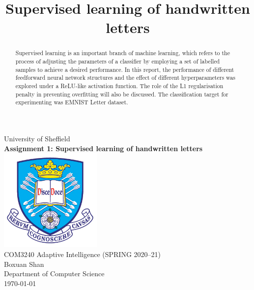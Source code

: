 \documentclass[conference]{IEEEtran}
\begin{document}
\begin{titlepage}


    \begin{center}
        {\LARGE University of Sheffield}\\[1.5cm]
        \linespread{1.2}\huge {\bfseries Assignment 1: Supervised learning of handwritten letters}\\[1.5cm]
        \linespread{1}
        \includegraphics[width=5cm]{images/tuoslogo.png}\\[1cm]
        {\large COM3240 Adaptive Intelligence (SPRING 2020--21)}\\[1cm]
        {\Large Boxuan Shan}\\[6cm]
        \large Department of Computer Science\\[1cm]
        \today
    \end{center}

\end{titlepage}

\title{Supervised learning of handwritten letters}

\author{
}

\maketitle

\thispagestyle{plain}
\pagestyle{plain}

\begin{abstract}
    Supervised learning is an important branch of machine learning, which refers to the process of adjusting the parameters of a classifier by employing a set of labelled samples to achieve a desired performance. In this report, the performance of different feedforward neural network structures and the effect of different hyperparameters was explored under a ReLU-like activation function. The role of the L1 regularisation penalty in preventing overfitting will also be discussed. The classification target for experimenting was EMNIST Letter dataset.
\end{abstract}
\end{document}
